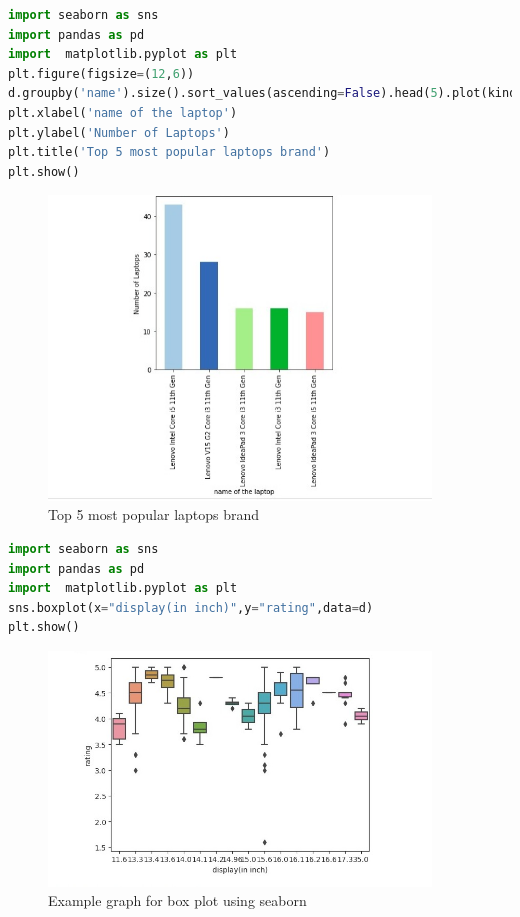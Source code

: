 \begin{lstlisting}[language=Python]
import seaborn as sns
import pandas as pd
import  matplotlib.pyplot as plt
plt.figure(figsize=(12,6))
d.groupby('name').size().sort_values(ascending=False).head(5).plot(kind = 'bar',color = sns.color_palette('Paired'))
plt.xlabel('name of the laptop')
plt.ylabel('Number of Laptops')
plt.title('Top 5 most popular laptops brand')
plt.show()
\end{lstlisting}
\vspace{5\baselineskip}
\begin{figure}[h]
\centering
 \footnotesize
 \includegraphics[width=4in]{5.png}
\caption{Top 5 most popular laptops brand}
\label{fig:dunnhalftone}
\end{figure} 
\begin{lstlisting}[language=Python]
import seaborn as sns
import pandas as pd
import  matplotlib.pyplot as plt
sns.boxplot(x="display(in inch)",y="rating",data=d)
plt.show()
\end{lstlisting}
\begin{figure}[h]
\centering
 \footnotesize
 \includegraphics[width=4in]{7.png}
\caption{Example graph for box plot using seaborn }
\label{fig:dunnhalftone}
\end{figure} 

